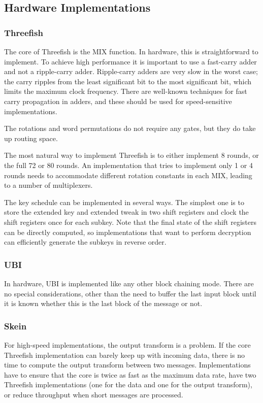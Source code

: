 \documentclass[11pt,twoside]{article}
\begin{document}
\subsection{Hardware Implementations}

\subsubsection{Threefish}

The core of Threefish is the MIX function. In hardware, this is straightforward to implement. To achieve high performance it is important to use a fast-carry adder and not a ripple-carry adder. Ripple-carry adders are very slow in the worst case; the carry ripples from the least significant bit to the most significant bit, which limits the maximum clock frequency. There are well-known techniques for fast carry propagation in adders, and these should be used for speed-sensitive implementations.

The rotations and word permutations do not require any gates, but they do take up routing space.

The most natural way to implement Threefish is to either implement 8 rounds, or the full 72 or 80 rounds. An implementation that tries to implement only 1 or 4 rounds needs to accommodate different rotation constants in each MIX, leading to a number of multiplexers.

The key schedule can be implemented in several ways. The simplest one is to store the extended key and extended tweak in two shift registers and clock the shift registers once for each subkey. Note that the final state of the shift registers can be directly computed, so implementations that want to perform decryption can efficiently generate the subkeys in reverse order.

\subsubsection{UBI}

In hardware, UBI is implemented like any other block chaining mode. There are no special considerations, other than the need to buffer the last input block until it is known whether this is the last block of the message or not.

\subsubsection{Skein}

For high-speed implementations, the output transform is a problem. If the core Threefish implementation can barely keep up with incoming data, there is no time to compute the output transform between two messages. Implementations have to ensure that the core is twice as fast as the maximum data rate, have two Threefish implementations (one for the data and one for the output transform), or reduce throughput when short messages are processed.
\end{document}
